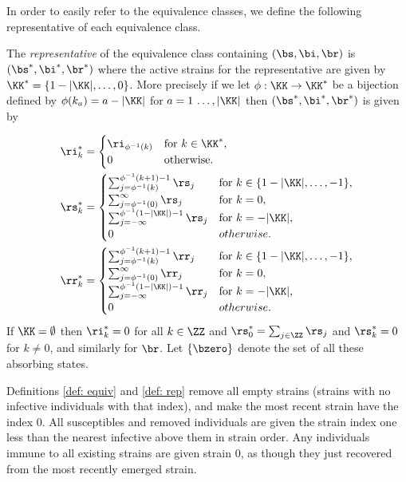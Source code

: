 \documentclass[review]{elsarticle}
\begin{document}
In order to easily refer to the equivalence classes, we define the following representative of each equivalence class.
\begin{mydef}\label{def: rep}
	The \emph{representative} of the equivalence class containing $(\bs, \bi, \br)$ is $(\bs^*, \bi^*, \br^*)$ where the active strains for the representative are given by $\KK^* = \{ 1 - |\KK|, \dots, 0 \}$. More precisely if we let $\phi: \KK \rightarrow \KK^*$ be a bijection defined by $\phi(k_a) = a - |\KK|$ for $a = 1\, \dots, |\KK|$ then $(\bs^*, \bi^*, \br^*)$ is given by

\begin{align*}
		\ri^*_k &= \begin{cases}
						\ri_{\phi^{-1}(k)} & \text{for } k \in \KK^*, \\
						0 & \text{otherwise.}
					\end{cases}\\
		\rs^*_k &= \begin{cases} 
\sum_{j = \phi^{-1}(k)}^{\phi^{-1}(k+1) - 1} \rs_j &\text{for } k\in \{ 1-|\KK|,\dots, - 1 \},\\
\sum_{j = \phi^{-1}(0)}^\infty \rs_j &\text{for } k = 0,\\
\sum_{j = -\infty}^{\phi^{-1}(1 - |\KK|) - 1} \rs_j &\text{for } k=-|\KK|,\\
0 & otherwise.  
\end{cases} \\
\rr^*_k &= \begin{cases} 
\sum_{j = \phi^{-1}(k)}^{\phi^{-1}(k+1) - 1} \rr_j &\text{for } k\in \{ 1-|\KK|,\dots, - 1 \},\\
\sum_{j = \phi^{-1}(0)}^\infty \rr_j &\text{for } k = 0,\\
\sum_{j = -\infty}^{\phi^{-1}(1 - |\KK|) - 1} \rr_j &\text{for } k=-|\KK|,\\
0 & otherwise.  
\end{cases}
\end{align*}
If $\KK = \emptyset$ then $\ri^*_k = 0$ for all $k \in \ZZ$ and $\rs^*_0 = \sum_{j \in \ZZ} \rs_j$ and $\rs^*_k = 0$ for $k \neq 0$, and similarly for $\br$. Let $\{\bzero\}$ denote the set of all these absorbing states.
\end{mydef}
Definitions \ref{def: equiv} and \ref{def: rep} remove all empty strains (strains with no infective individuals with that index), and make the most recent strain have the index $0$. All susceptibles and removed individuals are given the strain index one less than the nearest infective above them in strain order. Any individuals immune to all existing strains are given strain $0$, as though they just recovered from the most recently emerged strain.
\end{document}
